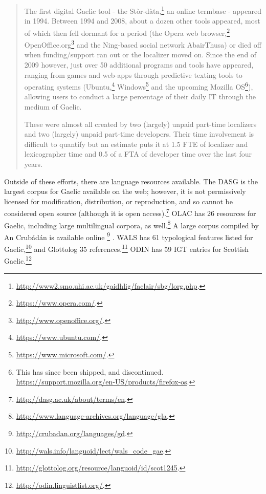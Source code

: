 \begin{quote}
  The first digital Gaelic tool - the St\`{o}r-d\`{a}ta,\footnote{\href{http://www2.smo.uhi.ac.uk/gaidhlig/faclair/sbg/lorg.php}{http://www2.smo.uhi.ac.uk/gaidhlig/faclair/sbg/lorg.php}. } an online termbase - appeared in 1994. Between 1994 and 2008, about a dozen other tools appeared, most of which then fell dormant for a period (the Opera web browser,\footnote{\href{https://www.opera.com/}{https://www.opera.com/}. } OpenOffice.org\footnote{\href{http://www.openoffice.org/}{http://www.openoffice.org/}. } and the Ning-based social network AbairThusa) or died off when funding/support ran out or the localizer moved on. Since the end of 2009 however, just over 50 additional programs and tools have appeared, ranging from games and web-apps through predictive texting tools to operating systems (Ubuntu,\footnote{\href{https://www.ubuntu.com/}{https://www.ubuntu.com/}. } Windows\footnote{\href{https://www.microsoft.com/}{https://www.microsoft.com/}. } and the upcoming Mozilla OS\footnote{This has since been shipped, and discontinued. \href{https://support.mozilla.org/en-US/products/firefox-os}{https://support.mozilla.org/en-US/products/firefox-os}. }), allowing users to conduct a large percentage of their daily IT through the medium of Gaelic.

  These were almost all created by two (largely) unpaid part-time localizers and two (largely) unpaid part-time developers. Their time involvement is difficult to quantify but an estimate puts it at 1.5 FTE of localizer and lexicographer time and 0.5 of a FTA of developer time over the last four years.
\end{quote}

Outside of these efforts, there are language resources available. The DASG is the largest corpus for Gaelic available on the web; however, it is not permissively licensed for modification, distribution, or reproduction, and so cannot be considered open source (although it is open access).\footnote{\href{http://dasg.ac.uk/about/terms/en}{http://dasg.ac.uk/about/terms/en}. } OLAC has 26 resources for Gaelic, including large multilingual corpora, as well.\footnote{\href{http://www.language-archives.org/language/gla}{http://www.language-archives.org/language/gla}. } A large corpus compiled by An Crub\'ad\'an is available online \footnote{\href{http://crubadan.org/languages/gd}{http://crubadan.org/languages/gd}. } \citep{scannell2007crubadan}. WALS has 61 typological features listed for Gaelic,\footnote{\href{http://wals.info/languoid/lect/wals_code_gae}{http://wals.info/languoid/lect/wals\_code\_gae}. } and Glottolog 35 references.\footnote{\href{http://glottolog.org/resource/languoid/id/scot1245}{http://glottolog.org/resource/languoid/id/scot1245}. } ODIN has 59 IGT entries for Scottish Gaelic.\footnote{\href{http://odin.linguistlist.org/}{http://odin.linguistlist.org/}. }

